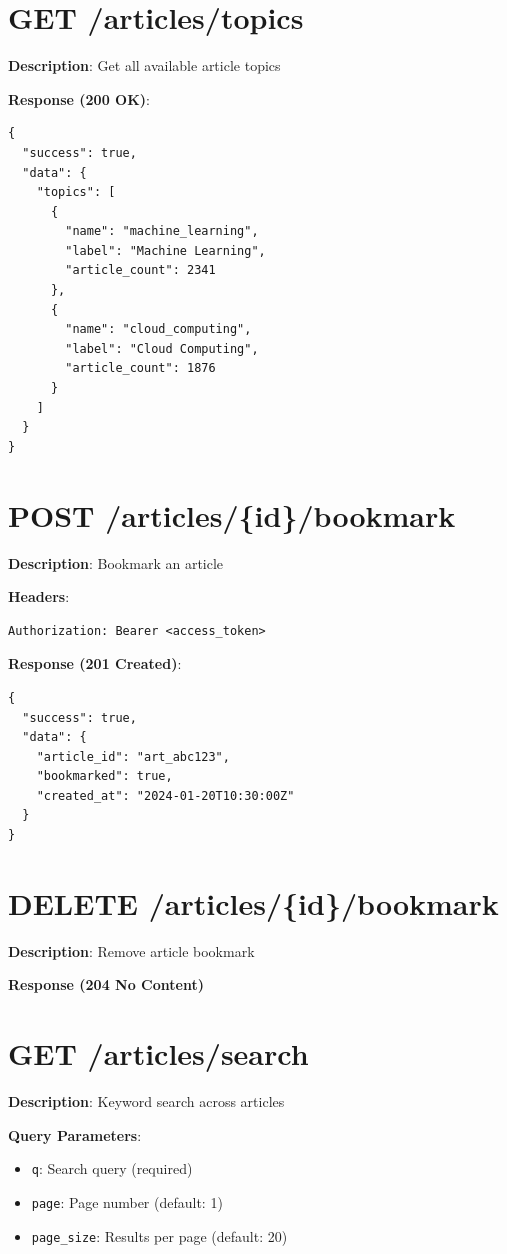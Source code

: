\documentclass[12pt,a4paper]{report}
\begin{document}
\section{GET /articles/topics}

\textbf{Description}: Get all available article topics

\textbf{Response (200 OK)}:
\begin{lstlisting}
{
  "success": true,
  "data": {
    "topics": [
      {
        "name": "machine_learning",
        "label": "Machine Learning",
        "article_count": 2341
      },
      {
        "name": "cloud_computing",
        "label": "Cloud Computing",
        "article_count": 1876
      }
    ]
  }
}
\end{lstlisting}

\section{POST /articles/\{id\}/bookmark}

\textbf{Description}: Bookmark an article

\textbf{Headers}:
\begin{lstlisting}
Authorization: Bearer <access_token>
\end{lstlisting}

\textbf{Response (201 Created)}:
\begin{lstlisting}
{
  "success": true,
  "data": {
    "article_id": "art_abc123",
    "bookmarked": true,
    "created_at": "2024-01-20T10:30:00Z"
  }
}
\end{lstlisting}

\section{DELETE /articles/\{id\}/bookmark}

\textbf{Description}: Remove article bookmark

\textbf{Response (204 No Content)}

\section{GET /articles/search}

\textbf{Description}: Keyword search across articles

\textbf{Query Parameters}:
\begin{itemize}
    \item \texttt{q}: Search query (required)
    \item \texttt{page}: Page number (default: 1)
    \item \texttt{page\_size}: Results per page (default: 20)
\end{itemize}
\end{document}
